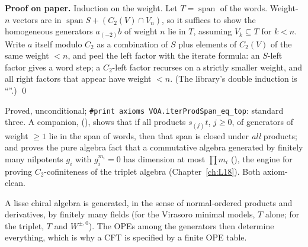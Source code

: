 \textbf{Proof on paper.} Induction on the weight. Let $T = \operatorname{span}$ of the words. Weight-$n$ vectors are in
$\operatorname{span}S + (C_2(V)\cap V_n)$, so it suffices to show the homogeneous generators $a_{(-2)}b$ of weight $n$ lie in
$T$, assuming $V_k\subseteq T$ for $k<n$. Write $a$ itself modulo $C_2$ as a combination of $S$ plus elements of $C_2(V)$ of
the same weight $<n$, and peel the left factor with the iterate formula: an $S$-left factor gives a word step; a
$C_2$-left factor recurses on a strictly smaller weight, and all right factors that appear have weight $<n$.
(The library's double induction is ``''.) \qed

\begin{status}
Proved, unconditional; \texttt{\#print axioms VOA.iterProdSpan\_eq\_top}: standard three. A companion,
 (), shows that if all
products $s_{(j)}t$, $j\ge0$, of generators of weight $\ge1$ lie in the span of words, then that span is closed under
\emph{all} products; and  proves the pure algebra
fact that a commutative algebra generated by finitely many nilpotents $g_i$ with $g_i^{m_i} = 0$ has dimension at most
$\prod m_i$ (), the engine for proving $C_2$-cofiniteness of the triplet
algebra (Chapter~\ref{ch:L18}). Both axiom-clean.
\end{status}

\begin{physics}
A lisse chiral algebra is generated, in the sense of normal-ordered products and derivatives, by finitely many
fields (for the Virasoro minimal models, $T$ alone; for the triplet, $T$ and $W^{\pm,0}$). The OPEs among the
generators then determine everything, which is why a CFT is specified by a finite OPE table.
\end{physics}

